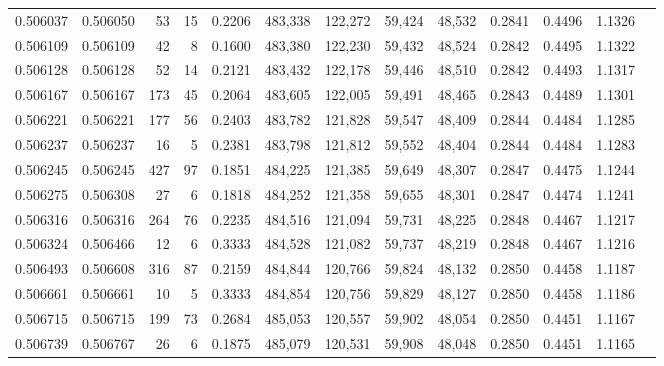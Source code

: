 \begin{tabular}{rrrrrrrrrrrrr}
0.506037 & 0.506050 &    53 &    15 &                                     0.2206 & 483,338 & 122,272 &  59,424 &  48,532 & 0.2841 & 0.4496 & 1.1326 \\
0.506109 & 0.506109 &    42 &     8 &                                     0.1600 & 483,380 & 122,230 &  59,432 &  48,524 & 0.2842 & 0.4495 & 1.1322 \\
0.506128 & 0.506128 &    52 &    14 &                                     0.2121 & 483,432 & 122,178 &  59,446 &  48,510 & 0.2842 & 0.4493 & 1.1317 \\
0.506167 & 0.506167 &   173 &    45 &                                     0.2064 & 483,605 & 122,005 &  59,491 &  48,465 & 0.2843 & 0.4489 & 1.1301 \\
0.506221 & 0.506221 &   177 &    56 &                                     0.2403 & 483,782 & 121,828 &  59,547 &  48,409 & 0.2844 & 0.4484 & 1.1285 \\
0.506237 & 0.506237 &    16 &     5 &                                     0.2381 & 483,798 & 121,812 &  59,552 &  48,404 & 0.2844 & 0.4484 & 1.1283 \\
0.506245 & 0.506245 &   427 &    97 &                                     0.1851 & 484,225 & 121,385 &  59,649 &  48,307 & 0.2847 & 0.4475 & 1.1244 \\
0.506275 & 0.506308 &    27 &     6 &                                     0.1818 & 484,252 & 121,358 &  59,655 &  48,301 & 0.2847 & 0.4474 & 1.1241 \\
0.506316 & 0.506316 &   264 &    76 &                                     0.2235 & 484,516 & 121,094 &  59,731 &  48,225 & 0.2848 & 0.4467 & 1.1217 \\
0.506324 & 0.506466 &    12 &     6 &                                     0.3333 & 484,528 & 121,082 &  59,737 &  48,219 & 0.2848 & 0.4467 & 1.1216 \\
0.506493 & 0.506608 &   316 &    87 &                                     0.2159 & 484,844 & 120,766 &  59,824 &  48,132 & 0.2850 & 0.4458 & 1.1187 \\
0.506661 & 0.506661 &    10 &     5 &                                     0.3333 & 484,854 & 120,756 &  59,829 &  48,127 & 0.2850 & 0.4458 & 1.1186 \\
0.506715 & 0.506715 &   199 &    73 &                                     0.2684 & 485,053 & 120,557 &  59,902 &  48,054 & 0.2850 & 0.4451 & 1.1167 \\
0.506739 & 0.506767 &    26 &     6 &                                     0.1875 & 485,079 & 120,531 &  59,908 &  48,048 & 0.2850 & 0.4451 & 1.1165 \\

\end{tabular}
